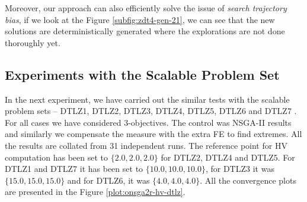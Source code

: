 \documentclass{sig-alternate-05-2015}
\begin{document}
Moreover, our approach can also efficiently solve the issue of \textit{search trajectory bias}, if we look at the Figure \ref{subfig:zdt4-gen-21}, we can see that the new solutions are deterministically generated where the explorations are not done thoroughly yet.

%
\begin{figure*}[tp!]
	\centering
	\hfill
	\hfill
	\caption{These plots illustrates the comparative analysis of the convergence rates for different 3-objective problems, the curves are actually consisted of box-plots. Here onsga2r denotes our algorithm and nsga2r is NSGA-II.}
	\label{plot:onsga2r-hv-dtlz}
\end{figure*}
%
\subsection{Experiments with the Scalable Problem Set}
\label{sec:onsga2r-dtlz}
In the next experiment, we have carried out the similar tests with the scalable problem sets -- DTLZ1, DTLZ2, DTLZ3, DTLZ4, DTLZ5, DTLZ6 and DTLZ7 \cite{dtlz-set}. For all cases we have considered \(3\)-objectives. The control was NSGA-II results and similarly we compensate the measure with the extra FE to find extremes. All the results are collated from 31 independent runs. The reference point for HV computation has been set to \(\{2.0, 2.0, 2.0\}\) for DTLZ2, DTLZ4 and DTLZ5. For DTLZ1 and DTLZ7 it has been set to \(\{10.0, 10.0, 10.0\}\), for DTLZ3 it was \(\{15.0, 15.0, 15.0\}\) and for DTLZ6, it was \(\{4.0, 4.0, 4.0\}\). All the convergence plots are presented in the Figure \ref{plot:onsga2r-hv-dtlz}. 
\end{document}

